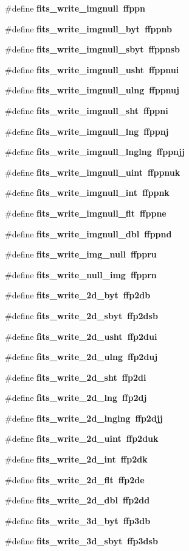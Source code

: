 \begin{CompactItemize}
\#define \bf{fits\_\-write\_\-imgnull}~ffppn
\item 
\#define \bf{fits\_\-write\_\-imgnull\_\-byt}~ffppnb
\item 
\#define \bf{fits\_\-write\_\-imgnull\_\-sbyt}~ffppnsb
\item 
\#define \bf{fits\_\-write\_\-imgnull\_\-usht}~ffppnui
\item 
\#define \bf{fits\_\-write\_\-imgnull\_\-ulng}~ffppnuj
\item 
\#define \bf{fits\_\-write\_\-imgnull\_\-sht}~ffppni
\item 
\#define \bf{fits\_\-write\_\-imgnull\_\-lng}~ffppnj
\item 
\#define \bf{fits\_\-write\_\-imgnull\_\-lnglng}~ffppnjj
\item 
\#define \bf{fits\_\-write\_\-imgnull\_\-uint}~ffppnuk
\item 
\#define \bf{fits\_\-write\_\-imgnull\_\-int}~ffppnk
\item 
\#define \bf{fits\_\-write\_\-imgnull\_\-flt}~ffppne
\item 
\#define \bf{fits\_\-write\_\-imgnull\_\-dbl}~ffppnd
\item 
\#define \bf{fits\_\-write\_\-img\_\-null}~ffppru
\item 
\#define \bf{fits\_\-write\_\-null\_\-img}~ffpprn
\item 
\#define \bf{fits\_\-write\_\-2d\_\-byt}~ffp2db
\item 
\#define \bf{fits\_\-write\_\-2d\_\-sbyt}~ffp2dsb
\item 
\#define \bf{fits\_\-write\_\-2d\_\-usht}~ffp2dui
\item 
\#define \bf{fits\_\-write\_\-2d\_\-ulng}~ffp2duj
\item 
\#define \bf{fits\_\-write\_\-2d\_\-sht}~ffp2di
\item 
\#define \bf{fits\_\-write\_\-2d\_\-lng}~ffp2dj
\item 
\#define \bf{fits\_\-write\_\-2d\_\-lnglng}~ffp2djj
\item 
\#define \bf{fits\_\-write\_\-2d\_\-uint}~ffp2duk
\item 
\#define \bf{fits\_\-write\_\-2d\_\-int}~ffp2dk
\item 
\#define \bf{fits\_\-write\_\-2d\_\-flt}~ffp2de
\item 
\#define \bf{fits\_\-write\_\-2d\_\-dbl}~ffp2dd
\item 
\#define \bf{fits\_\-write\_\-3d\_\-byt}~ffp3db
\item 
\#define \bf{fits\_\-write\_\-3d\_\-sbyt}~ffp3dsb

\end{CompactItemize}
